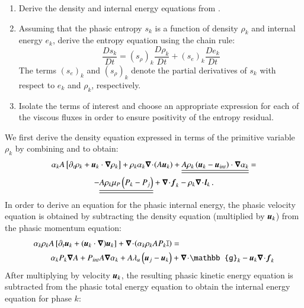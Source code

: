 \documentclass[preprint,10pt]{elsarticle}
\begin{document}
%
\begin{enumerate}
\item Derive the density and internal energy equations from .
\item Assuming that the phasic entropy $s_k$ is a function of density $\rho_k$ and internal energy $e_k$, derive the entropy equation using the chain rule:
\begin{equation}
\label{eq:chain_rule-sct4}
\frac{Ds_k}{Dt} = \left( s_{\rho} \right)_k \frac{D \rho_k}{Dt} + \left( s_{e} \right)_k \frac{D e_k}{Dt} 
\end{equation}
The terms $(s_e)_k$ and $(s_{\rho})_k$ denote the partial derivatives of $s_k$ with respect to $e_k$ and $\rho_k$, respectively.
\item Isolate the terms of interest and choose an appropriate expression for each of the viscous fluxes in order to ensure positivity of the entropy residual.
\end{enumerate}
%
We first derive the density equation expressed in terms of the primitive variable $\rho_k$ by combining  and  to obtain:
%
\begin{multline}\label{eq:rho-7-eqn-model-sect4}
\alpha_k A \left[ \partial_t \rho_k + \boldsymbol u_k  \cdot \boldsymbol\nabla \rho_k \right] 
+ \rho_k \alpha_k \boldsymbol\nabla\! \cdot \! (A \boldsymbol u_k ) 
+  \underline{\underline{ A \rho_k \left( \boldsymbol u_k - \boldsymbol u_{int} \right) \cdot \boldsymbol\nabla \alpha_k}} = \\-\underline{\underline{A \rho_k \mu_P \left( P_k - P_j \right)}} + \boldsymbol\nabla\! \cdot \! \boldsymbol f_k - \rho_k \boldsymbol\nabla\! \cdot \! \boldsymbol l_k \,.
\end{multline}
%
In order to derive an equation for the phasic internal energy, the phasic velocity equation is obtained by subtracting the density equation (multiplied by $\boldsymbol u_k$) from the phasic momentum equation:
%
\begin{align}\label{eq:vel-7-eqn-model-sect4}
\alpha_k \rho_k  A \left[ \partial_t \mbold u_k + (\mbold u_k \cdot \grad) \mbold u_k \right]  + \div \left( \alpha_k \rho_k A P_k \mathbb{I} \right) &=\nonumber\\
\alpha_k P_k \grad A + P_{int} A \grad \alpha_k + A \lambda_u \left( \mbold u_j - \mbold u_k \right) &+ \div \mathbb{g}_k - \mbold u_k \div \mbold f_k
\end{align}
%
After multiplying  by velocity $\boldsymbol u_k$, the resulting phasic kinetic energy equation is subtracted from the phasic total energy equation to obtain the internal energy equation for phase $k$:
\end{document}
